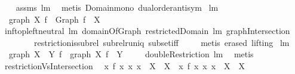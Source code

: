 \begin{isabellebody}
%
\isadelimproof
\ \ %
\endisadelimproof
%
\isatagproof
{}\isamarkupfalse%
\ assms\ lm{}{}{}\ \isamarkupfalse%
\ {\isacharparenleft}metis\ Domain{\isacharunderscore}mono\ dual{\isacharunderscore}order{\isachardot}antisym{\isacharparenright}%
\endisatagproof
{\isafoldproof}%
%
\isadelimproof
\isanewline
%
\endisadelimproof
\isanewline
{}\isamarkupfalse%
\ lm{}{}{}{\isacharcolon}\ \isanewline
\ \ {\isachardoublequoteopen}graph\ X\ f\ {\isacharequal}\ {\isacharparenleft}Graph\ f{\isacharparenright}\ {\isacharbar}{\isacharbar}\ X{\isachardoublequoteclose}\ \isanewline
%
\isadelimproof
\ \ %
\endisadelimproof
%
\isatagproof
{}\isamarkupfalse%
\ inf{\isacharunderscore}top{\isachardot}left{\isacharunderscore}neutral\ lm{}{}{}\ domainOfGraph\ restrictedDomain\ lm{}{}{}\ graphIntersection\isanewline
\ \ \ \ \ \ \ \ restriction{\isacharunderscore}is{\isacharunderscore}subrel\ subrel{\isacharunderscore}runiq\ subset{\isacharunderscore}iff\ \isanewline
\ \ \isamarkupfalse%
\ {\isacharparenleft}metis\ {\isacharparenleft}erased{\isacharcomma}\ lifting{\isacharparenright}{\isacharparenright}%
\endisatagproof
{\isafoldproof}%
%
\isadelimproof
\isanewline
%
\endisadelimproof
\isanewline
{}\isamarkupfalse%
\ lm{}{}{}{\isacharcolon}\ \isanewline
\ \ {\isachardoublequoteopen}graph\ {\isacharparenleft}X\ {\isasyminter}\ Y{\isacharparenright}\ f\ {\isacharequal}\ {\isacharparenleft}graph\ X\ f{\isacharparenright}\ {\isacharbar}{\isacharbar}\ Y{\isachardoublequoteclose}\ \isanewline
%
\isadelimproof
\ \ %
\endisadelimproof
%
\isatagproof
{}\isamarkupfalse%
\ doubleRestriction\ lm{}{}{}\ \isamarkupfalse%
\ metis%
\endisatagproof
{\isafoldproof}%
%
\isadelimproof
\isanewline
%
\endisadelimproof
\isanewline
{}\isamarkupfalse%
\ restrictionVsIntersection{\isacharcolon}\isanewline
\ \ {\isachardoublequoteopen}{\isacharbraceleft}{\isacharparenleft}x{\isacharcomma}\ f\ x{\isacharparenright}{\isacharbar}\ x{\isachardot}\ x\ {\isasymin}\ X{}{\isacharbraceright}\ {\isacharbar}{\isacharbar}\ X{}\ {\isacharequal}\ {\isacharbraceleft}{\isacharparenleft}x{\isacharcomma}\ f\ x{\isacharparenright}{\isacharbar}\ x{\isachardot}\ x\ {\isasymin}\ X{}\ {\isasyminter}\ X{}{\isacharbraceright}{\isachardoublequoteclose}\ \isanewline

\end{isabellebody}
